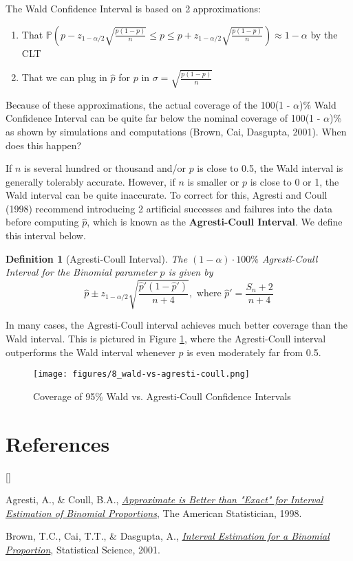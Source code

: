 \documentclass[twoside]{article}
\def\beginrefs{\begin{list}%
        {[\arabic{equation}]}{\usecounter{equation}
         \setlength{\leftmargin}{2.0truecm}\setlength{\labelsep}{0.4truecm}%
         \setlength{\labelwidth}{1.6truecm}}}
\def\endrefs{\end{list}}
\def\bibentry#1{\item[\hbox{[#1]}]}
\newtheorem{definition}[theorem]{Definition}
\theoremstyle{definition}
\begin{document}
The Wald Confidence Interval is based on 2 approximations:
\begin{enumerate}
   \item That $\mathbb{P}\left(p - z_{1-\alpha/2} \sqrt{\frac{p(1-p)}{n}} \leq p \leq p + z_{1-\alpha/2} \sqrt{\frac{p(1-p)}{n}}\right) \approx 1 - \alpha$ by the CLT
   \item That we can plug in $\widehat{p}$ for $p$ in $\sigma = \sqrt{\frac{p (1-p)}{n}}$
\end{enumerate}

Because of these approximations, the \color{blue} actual \color{black} coverage of the 100(1 - $\alpha$)\% Wald Confidence Interval can be quite far below the \color{blue} nominal \color{black} coverage of 100(1 - $\alpha$)\% as shown by simulations and computations (Brown, Cai, Dasgupta, 2001). When does this happen?

If $n$ is several hundred or thousand and/or $p$ is close to 0.5, the Wald interval is generally \color{blue} tolerably \color{black} accurate. However, if $n$ is smaller or $p$ is close to 0 or 1, the Wald interval can be quite inaccurate. To correct for this, Agresti and Coull (1998) recommend introducing \color{blue} 2 artificial successes and failures \color{black} into the data before computing $\widehat{p}$, which is known as the \textbf{Agresti-Coull Interval}. We define this interval below.
\begin{definition}[Agresti-Coull Interval]
   The $(1-\alpha)\cdot 100\%$ Agresti-Coull Interval for the Binomial parameter $p$ is given by
   \begin{equation}
      \widehat{p} \pm z_{1-\alpha/2} \sqrt{\frac{\widehat{p}'(1-\widehat{p}')}{n + 4}}, \text{ where } \widehat{p}' = \frac{S_n + 2}{n + 4}
   \end{equation}
\end{definition}
In many cases, the Agresti-Coull interval achieves much better coverage than the Wald interval. This is pictured in Figure \ref{fig:wald-vs-agresti-coull}, where the Agresti-Coull interval outperforms the Wald interval whenever $p$ is even moderately far from 0.5.

\begin{figure}[H]
   \centering
   \texttt{[image: figures/8\_wald-vs-agresti-coull.png]}
   \caption{Coverage of 95\% Wald vs. Agresti-Coull Confidence Intervals}
   \label{fig:wald-vs-agresti-coull}
\end{figure}

\section*{References}
\beginrefs
\bibentry{AC}{Agresti, A., \& Coull, B.A.},
{\it \href{http://dx.doi.org/10.1080/00031305.1998.10480550}{Approximate is Better than "Exact" for Interval Estimation of Binomial Proportions}},
{The American Statistician},
{1998}.

\bibentry{BCD}{Brown, T.C., Cai, T.T., \& Dasgupta, A.},
{\it \href{http://www.jstor.org/stable/2676784}{Interval Estimation for a Binomial Proportion}},
{Statistical Science},
{2001}.

\endrefs
\end{document}
